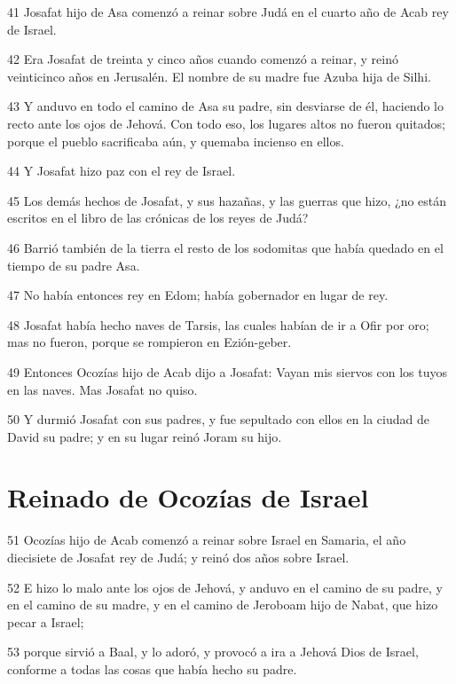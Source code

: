 \par 41 Josafat hijo de Asa comenzó a reinar sobre Judá en el cuarto año de Acab rey de Israel.
\par 42 Era Josafat de treinta y cinco años cuando comenzó a reinar, y reinó veinticinco años en Jerusalén. El nombre de su madre fue Azuba hija de Silhi.
\par 43 Y anduvo en todo el camino de Asa su padre, sin desviarse de él, haciendo lo recto ante los ojos de Jehová. Con todo eso, los lugares altos no fueron quitados; porque el pueblo sacrificaba aún, y quemaba incienso en ellos.
\par 44 Y Josafat hizo paz con el rey de Israel.
\par 45 Los demás hechos de Josafat, y sus hazañas, y las guerras que hizo, ¿no están escritos en el libro de las crónicas de los reyes de Judá?
\par 46 Barrió también de la tierra el resto de los sodomitas que había quedado en el tiempo de su padre Asa.
\par 47 No había entonces rey en Edom; había gobernador en lugar de rey.
\par 48 Josafat había hecho naves de Tarsis, las cuales habían de ir a Ofir por oro; mas no fueron, porque se rompieron en Ezión-geber.
\par 49 Entonces Ocozías hijo de Acab dijo a Josafat: Vayan mis siervos con los tuyos en las naves. Mas Josafat no quiso.
\par 50 Y durmió Josafat con sus padres, y fue sepultado con ellos en la ciudad de David su padre; y en su lugar reinó Joram su hijo.

\section*{Reinado de Ocozías de Israel}

\par 51 Ocozías hijo de Acab comenzó a reinar sobre Israel en Samaria, el año diecisiete de Josafat rey de Judá; y reinó dos años sobre Israel.
\par 52 E hizo lo malo ante los ojos de Jehová, y anduvo en el camino de su padre, y en el camino de su madre, y en el camino de Jeroboam hijo de Nabat, que hizo pecar a Israel;
\par 53 porque sirvió a Baal, y lo adoró, y provocó a ira a Jehová Dios de Israel, conforme a todas las cosas que había hecho su padre. 

